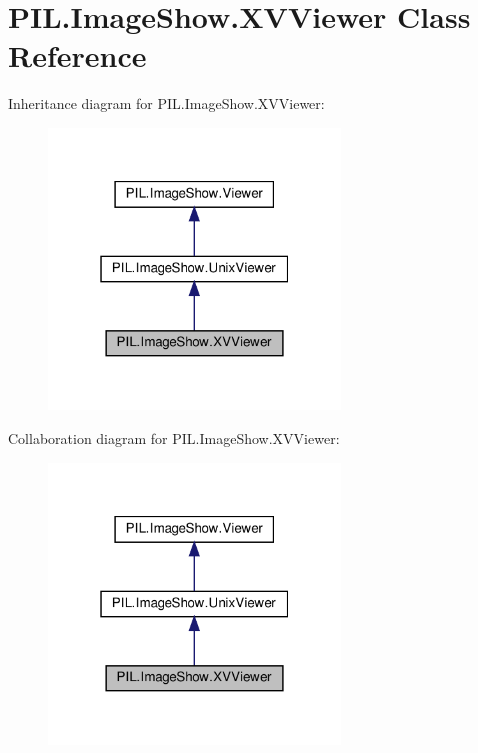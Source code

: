 \hypertarget{classPIL_1_1ImageShow_1_1XVViewer}{}\section{P\+I\+L.\+Image\+Show.\+X\+V\+Viewer Class Reference}
\label{classPIL_1_1ImageShow_1_1XVViewer}


Inheritance diagram for P\+I\+L.\+Image\+Show.\+X\+V\+Viewer\+:
\nopagebreak
\begin{figure}[H]
\begin{center}
\leavevmode
\includegraphics[width=220pt]{classPIL_1_1ImageShow_1_1XVViewer__inherit__graph}
\end{center}
\end{figure}


Collaboration diagram for P\+I\+L.\+Image\+Show.\+X\+V\+Viewer\+:
\nopagebreak
\begin{figure}[H]
\begin{center}
\leavevmode
\includegraphics[width=220pt]{classPIL_1_1ImageShow_1_1XVViewer__coll__graph}
\end{center}
\end{figure}
